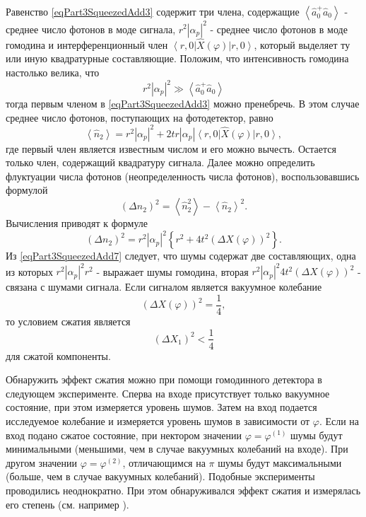 Равенство \eqref{eqPart3SqueezedAdd3} содержит три члена, содержащие 
$\left<\hat{a}_0^{+}\hat{a}_0\right>$ - среднее число фотонов в моде
сигнала, $r^2\left|\alpha_p\right|^2$ - среднее число фотонов в моде
гомодина и интерференционный член 
$\left<r, 0\right|\hat{X}\left(\varphi\right)\left|r, 0\right>$,
который выделяет ту или иную квадратурные составляющие. Положим, что
интенсивность гомодина настолько велика, что 
\[
r^2 \left|\alpha_p\right|^2 \gg 
\left<\hat{a}_0^{+}\hat{a}_0\right>
\]
тогда первым членом в \eqref{eqPart3SqueezedAdd3} можно пренебречь. В
этом случае среднее число фотонов, поступающих на фотодетектор, равно
\begin{equation}
\left<\hat{n}_2\right> = 
r^2 \left|\alpha_p\right|^2 + 2 t r \left|\alpha_p\right|
\left<r, 0\right|\hat{X}\left(\varphi\right)\left|r, 0\right>,
\nonumber
\end{equation}
где первый член является известным числом и его можно
вычесть. Остается только член, содержащий квадратуру сигнала. Далее
можно определить флуктуации числа фотонов (неопределенность числа
фотонов), воспользовавшись формулой
\begin{equation}
\left(\Delta n_2\right)^2 = 
\left<\hat{n}_2^2\right>
-
\left<\hat{n}_2\right>^2.
\nonumber
\end{equation}
Вычисления приводят к формуле
\begin{equation}
\left(\Delta n_2\right)^2 =
r^2 \left|\alpha_p\right|^2
\left\{
r^2 + 4 t^2 
\left(
\Delta X \left(\varphi\right)
\right)^2
\right\}.
\label{eqPart3SqueezedAdd7}
\end{equation}
Из \eqref{eqPart3SqueezedAdd7} следует, что шумы содержат две
составляющих, одна из которых $r^2 \left|\alpha_p\right|^2 r^2$ -
выражает шумы гомодина, вторая 
$r^2 \left|\alpha_p\right|^2 4 t^2 
\left(
\Delta X \left(\varphi\right)
\right)^2$ -  связана с шумами сигнала. Если сигналом является вакуумное
колебание 
\[
\left(\Delta X \left(\varphi\right)\right)^2  = \frac{1}{4},
\] 
то условием сжатия является 
\[
\left(\Delta X_1 \right)^2 < \frac{1}{4}
\]
для сжатой компоненты. 

Обнаружить эффект сжатия можно при помощи
гомодинного детектора в следующем эксперименте. Сперва на входе
присутствует только вакуумное состояние, при этом измеряется уровень
шумов. Затем на вход подается исследуемое колебание и измеряется
уровень шумов в зависимости от $\varphi$. Если на вход подано сжатое
состояние, при нектором значении $\varphi = \varphi^{(1)}$ шумы будут
минимальными (меньшими, чем в случае вакуумных колебаний на входе). При
другом значении $\varphi = \varphi^{(2)}$, отличающимся на $\pi$ шумы
будут максимальными (больше, чем в случае вакуумных
колебаний). Подобные эксперименты проводились неоднократно. При этом
обнаруживался эффект сжатия и измерялась его степень (см. например
\cite{bNonclassSqueezedStateDetection}). 

